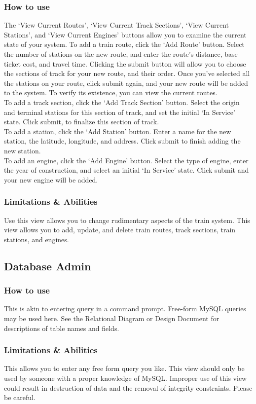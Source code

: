 \documentclass[letter]{article}
\begin{document}
\subsubsection{How to use}
The `View Current Routes', `View Current Track Sections', `View Current Stations', and `View Current Engines' buttons allow you to examine the current state of your system.
To add a train route, click the `Add Route' button. Select the number of stations on the new route, and enter the route's distance, base ticket cost, and travel time. Clicking the submit button will allow you to choose the sections of track for your new route, and their order. Once you've selected all the stations on your route, click submit again, and your new route will be added to the system. To verify its existence, you can view the current routes.\\
To add a track section, click the `Add Track Section' button. Select the origin and terminal stations for this section of track, and set the initial `In Service' state. Click submit, to finalize this section of track. \\
To add a station, click the `Add Station' button. Enter a name for the new station, the latitude, longitude, and address. Click submit to finish adding the new station. \\
To add an engine, click the `Add Engine' button. Select the type of engine, enter the year of construction, and select an initial `In Service' state. Click submit and your new engine will be added.
\subsubsection{Limitations \& Abilities}
Use this view allows you to change rudimentary aspects of the train system. This view allows you to add, update, and delete train routes, track sections, train stations, and engines.

\subsection{Database Admin}
\subsubsection{How to use}
This is akin to entering query in a command prompt. Free-form MySQL queries may be used here. See the Relational Diagram or Design Document for descriptions of table names and fields.

\subsubsection{Limitations \& Abilities}
This allows you to enter any free form query you like. This view should only be used by someone with a proper knowledge of MySQL. Improper use of this view could result in destruction of data and the removal of integrity constraints. Please be careful.


\end{document}
